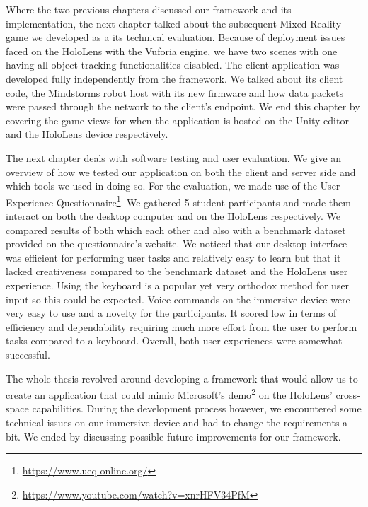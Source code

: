 Where the two previous chapters discussed our framework and its implementation, the next chapter talked about the subsequent Mixed Reality game we developed as a its technical evaluation. Because of deployment issues faced on the HoloLens with the Vuforia engine, we have two scenes with one having all object tracking functionalities disabled. The client application was developed fully independently from the framework. We talked about its client code, the Mindstorms robot host with its new firmware and how data packets were passed through the network to the client's endpoint. We end this chapter by covering the game views for when the application is hosted on the Unity editor and the HoloLens device respectively.

The next chapter deals with software testing and user evaluation. We give an overview of how we tested our application on both the client and server side and which tools we used in doing so.
For the evaluation, we made use of the User Experience Questionnaire\footnote{\protect\url{https://www.ueq-online.org/}}. We gathered 5 student participants and made them interact on both the desktop computer and on the HoloLens respectively. We compared results of both which each other and also with a benchmark dataset provided on the questionnaire's website.
We noticed that our desktop interface was efficient for performing user tasks and relatively easy to learn but that it lacked creativeness compared to the benchmark dataset and the HoloLens user experience. Using the keyboard is a popular yet very orthodox method for user input so this could be expected.
Voice commands on the immersive device were very easy to use and a novelty for the participants. It scored low in terms of efficiency and dependability requiring much more effort from the user to perform tasks compared to a keyboard. Overall, both user experiences were somewhat successful.

The whole thesis revolved around developing a framework that would allow us to create an application that could mimic Microsoft's demo\footnote{\protect\url{https://www.youtube.com/watch?v=xnrHFV34PfM}} on the HoloLens' cross-space capabilities. During the development process however, we encountered some technical issues on our immersive device and had to change the requirements a bit. We ended by discussing possible future improvements for our framework.


